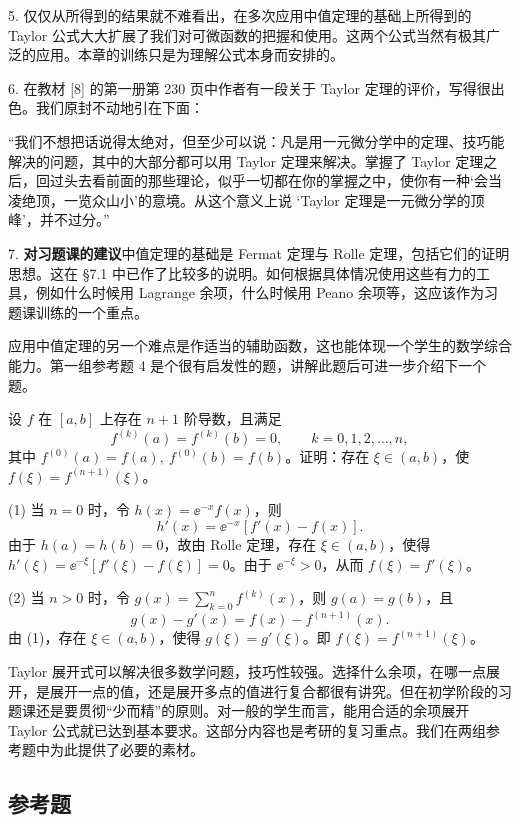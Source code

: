 5. 仅仅从所得到的结果就不难看出，在多次应用中值定理的基础上所得到的 Taylor 公式大大扩展了我们对可微函数的把握和使用。这两个公式当然有极其广泛的应用。本章的训练只是为理解公式本身而安排的。

6. 在教材 [8] 的第一册第 230 页中作者有一段关于 Taylor 定理的评价，写得很出色。我们原封不动地引在下面：

“我们不想把话说得太绝对，但至少可以说：凡是用一元微分学中的定理、技巧能解决的问题，其中的大部分都可以用 Taylor 定理来解决。掌握了 Taylor 定理之后，回过头去看前面的那些理论，似乎一切都在你的掌握之中，使你有一种‘会当凌绝顶，一览众山小’的意境。从这个意义上说 ‘Taylor 定理是一元微分学的顶峰’，并不过分。”

7. \textbf{对习题课的建议}\quad 中值定理的基础是 Fermat 定理与 Rolle 定理，包括它们的证明思想。这在 §7.1 中已作了比较多的说明。如何根据具体情况使用这些有力的工具，例如什么时候用 Lagrange 余项，什么时候用 Peano 余项等，这应该作为习题课训练的一个重点。

应用中值定理的另一个难点是作适当的辅助函数，这也能体现一个学生的数学综合能力。第一组参考题 4 是个很有启发性的题，讲解此题后可进一步介绍下一个题。

\begin{xexample}[7.3.1]
设 $f$ 在 $[a,b]$ 上存在 $n+1$ 阶导数，且满足
\[
  f^{(k)}(a)=f^{(k)}(b)=0,\qquad k=0,1,2,\ldots,n,
\]
其中 $f^{(0)}(a)=f(a),\ f^{(0)}(b)=f(b)$。证明：存在 $\xi\in(a,b)$，使 $f(\xi)=f^{(n+1)}(\xi)$。
\end{xexample}
\begin{xproof}
(1) 当 $n=0$ 时，令 $h(x)=\ee^{-x}f(x)$，则
\[
  h'(x)=\ee^{-x}[f'(x)-f(x)].
\]
由于 $h(a)=h(b)=0$，故由 Rolle 定理，存在 $\xi\in(a,b)$，使得 $h'(\xi)=\ee^{-\xi}[f'(\xi)-f(\xi)]=0$。由于 $\ee^{-\xi}>0$，从而 $f(\xi)=f'(\xi)$。

(2) 当 $n>0$ 时，令 $g(x)=\sum_{k=0}^n f^{(k)}(x)$，则 $g(a)=g(b)$，且
\[
  g(x)-g'(x)=f(x)-f^{(n+1)}(x).
\]
由 (1)，存在 $\xi\in(a,b)$，使得 $g(\xi)=g'(\xi)$。即 $f(\xi)=f^{(n+1)}(\xi)$。
\end{xproof}

Taylor 展开式可以解决很多数学问题，技巧性较强。选择什么余项，在哪一点展开，是展开一点的值，还是展开多点的值进行复合都很有讲究。但在初学阶段的习题课还是要贯彻“少而精”的原则。对一般的学生而言，能用合适的余项展开 Taylor 公式就已达到基本要求。这部分内容也是考研的复习重点。我们在两组参考题中为此提供了必要的素材。

\subsection{参考题}

